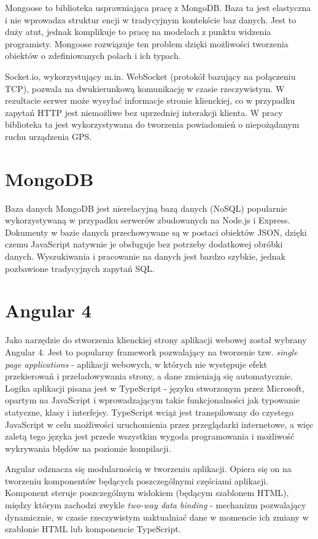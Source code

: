 \documentclass[eng,printmode]{mgr}
\begin{document}
Mongoose to biblioteka usprawniająca pracę z MongoDB. Baza ta jest elastyczna i nie wprowadza struktur encji w tradycyjnym kontekście baz danych. Jest to duży atut, jednak komplikuje to pracę na modelach z punktu widzenia programisty. Mongoose rozwiązuje ten problem dzięki możliwości tworzenia obiektów o zdefiniowanych polach i ich typach.

Socket.io, wykorzystujący m.in. WebSocket (protokół bazujący na połączeniu TCP), pozwala na dwukierunkową komunikację w czasie rzeczywistym. W rezultacie serwer może wysyłać informacje stronie klienckiej, co w przypadku zapytań HTTP jest niemożliwe bez uprzedniej interakcji klienta. W pracy biblioteka ta jest wykorzystywana do tworzenia powiadomień o niepożądanym ruchu urządzenia GPS.

\section{MongoDB}
Baza danych MongoDB jest nierelacyjną bazą danych (NoSQL) popularnie wykorzystywaną w przypadku serwerów zbudowanych na Node.js i Express. Dokumenty w bazie danych przechowywane są w postaci obiektów JSON, dzięki czemu JavaScript natywnie je obsługuje bez potrzeby dodatkowej obróbki danych. Wyszukiwania i pracowanie na danych jest bardzo szybkie, jednak pozbawione tradycyjnych zapytań SQL.
\section{Angular 4}
Jako narzędzie do stworzenia klienckiej strony aplikacji webowej został wybrany Angular 4. Jest to popularny framework pozwalający na tworzenie tzw. \textit{single page applications} - aplikacji webowych, w których nie występuje efekt przekierowań i przeładowywania strony, a dane zmieniają się automatycznie. Logika aplikacji pisana jest w TypeScript - języku stworzonym przez Microsoft, opartym na JavaScript i wprowadzającym takie funkcjonalności jak typowanie statyczne, klasy i interfejsy. TypeScript wciąż jest transpilowany do czystego JavaScript w celu możliwości uruchomienia przez przeglądarki internetowe, a więc zaletą tego języka jest przede wszystkim wygoda programowania i możliwość wykrywania błędów na poziomie kompilacji.

Angular odznacza się modularnością w tworzeniu aplikacji. Opiera się on na tworzeniu komponentów będących poszczególnymi częściami aplikacji. Komponent steruje poszczególnym widokiem (będącym szablonem HTML), między którym zachodzi zwykle \textit{two-way data binding} - mechanizm pozwalający dynamicznie, w czasie rzeczywistym uaktualniać dane w momencie ich zmiany w szablonie HTML lub komponencie TypeScript.
\end{document}

